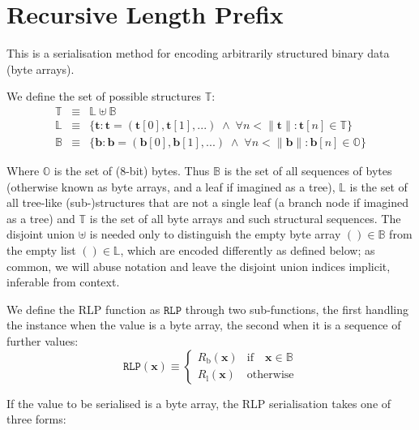 \documentclass[9pt,oneside]{amsart}
\makeatletter
\newcommand{\linkdest}[1]{\Hy@raisedlink{\hypertarget{#1}{}}}
\makeatother
\begin{document}
\section{Recursive Length Prefix}\label{app:rlp}\hypertarget{rlp}{}
This is a serialisation method for encoding arbitrarily structured binary data (byte arrays).

We define the set of possible structures $\mathbb{T}$:
\begin{eqnarray}
\mathbb{T} & \equiv & \mathbb{L} \uplus \mathbb{B} \\
\mathbb{L} & \equiv & \{ \mathbf{t}: \mathbf{t} = ( \mathbf{t}[0], \mathbf{t}[1], ... ) \; \wedge \; \forall n < \lVert \mathbf{t} \rVert : \mathbf{t}[n] \in \mathbb{T} \} \\
\mathbb{B} & \equiv & \{ \mathbf{b}: \mathbf{b} = ( \mathbf{b}[0], \mathbf{b}[1], ... ) \; \wedge \; \forall n < \lVert \mathbf{b} \rVert : \mathbf{b}[n] \in \mathbb{O} \}
\end{eqnarray}

Where $\mathbb{O}$ is the set of (8-bit) bytes. Thus $\mathbb{B}$ is the set of all sequences of bytes (otherwise known as byte arrays, and a leaf if imagined as a tree), $\mathbb{L}$ is the set of all tree-like (sub-)structures that are not a single leaf (a branch node if imagined as a tree) and $\mathbb{T}$ is the set of all byte arrays and such structural sequences. The disjoint union $\uplus$ is needed only to distinguish the empty byte array $()\in\mathbb{B}$ from the empty list $()\in\mathbb{L}$, which are encoded differently as defined below; as common, we will abuse notation and leave the disjoint union indices implicit, inferable from context.

We define the RLP function as $\mathtt{RLP}$ through two sub-functions, the first handling the instance when the value is a byte array, the second when it is a sequence of further values:
\begin{equation}
\mathtt{RLP}(\mathbf{x}) \equiv \begin{cases} R_{\mathrm{b}}(\mathbf{x}) & \text{if} \quad \mathbf{x} \in \mathbb{B} \\ R_{\mathrm{l}}(\mathbf{x}) & \text{otherwise} \end{cases}
\end{equation}

\hypertarget{RLP_serialisation_of_a_byte_array_R__b_word_def}{}\linkdest{R__b}If the value to be serialised is a byte array, the RLP serialisation takes one of three forms:
\end{document}
